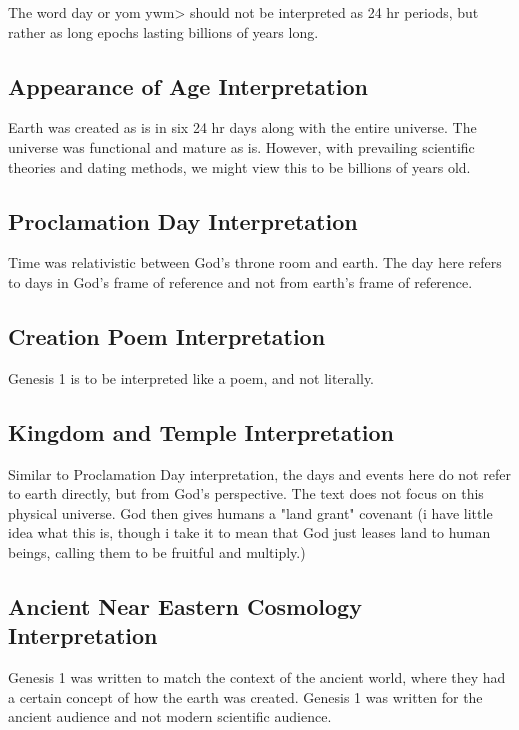 \documentclass[11]{article}
\begin{document}
The word day or yom \<ywm> should not be interpreted as 24 hr periods, but rather as long epochs lasting billions of years long.

\subsection{Appearance of Age Interpretation}

Earth was created as is in six 24 hr days along with the entire universe. The universe was functional and mature as is. However, with prevailing scientific theories and dating methods, we might view this to be billions of years old.

\subsection{Proclamation Day Interpretation}

Time was relativistic between God's throne room and earth. The day here refers to days in God's frame of reference and not from earth's frame of reference.

\subsection{Creation Poem Interpretation}

Genesis 1 is to be interpreted like a poem, and not literally.

\subsection{Kingdom and Temple Interpretation}

Similar to Proclamation Day interpretation, the days and events here do not refer to earth directly, but from God's perspective. The text does not focus on this physical universe. God then gives humans a "land grant" covenant (i have little idea what this is, though i take it to mean that God just leases land to human beings, calling them to be fruitful and multiply.)

\subsection{Ancient Near Eastern Cosmology Interpretation}

Genesis 1 was written to match the context of the ancient world, where they had a certain concept of how the earth was created. Genesis 1 was written for the ancient audience and not modern scientific audience.
\end{document}
